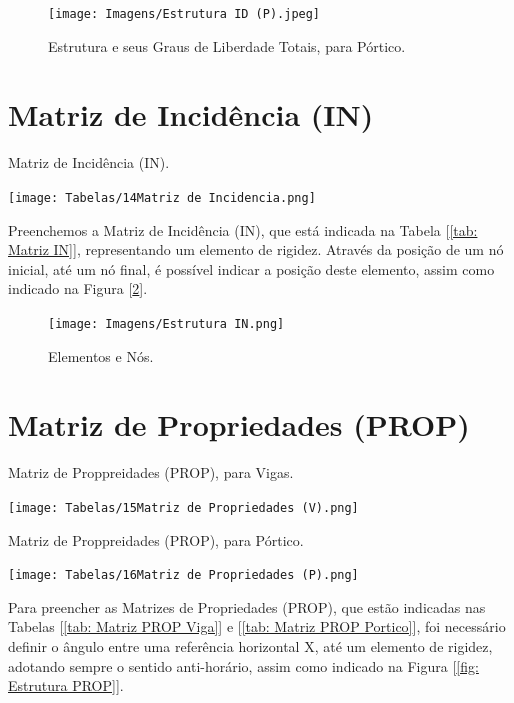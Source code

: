 \documentclass[deposito, acronym, symbols]{fei}
\begin{document}
 \begin{figure}[!htb]
 \centering
    \caption{Estrutura e seus Graus de Liberdade Totais, para Pórtico.}
    \texttt{[image: Imagens/Estrutura ID (P).jpeg]}
    \label{fig: Estrutura LM Portico}
 \end{figure}

\section{Matriz de Incidência (IN)}

\begin{table}[!htb]
 \centering
    \caption{Matriz de Incidência (IN).}
    \texttt{[image: Tabelas/14Matriz de Incidencia.png]}
    \label{tab: Matriz IN}
 \end{table}
 
Preenchemos a Matriz de Incidência (IN), que está indicada na Tabela [\ref{tab: Matriz IN}], representando um elemento de rigidez. Através da posição de um nó inicial, até um nó final, é possível indicar a posição deste elemento, assim como indicado na Figura [\ref{fig: Estrutura IN}].

\begin{figure}[!htb]
 \centering
    \caption{Elementos e Nós.}
    \texttt{[image: Imagens/Estrutura IN.png]}
    \label{fig: Estrutura IN}
 \end{figure}
 
\section{Matriz de Propriedades (PROP)}

\begin{table}[!htb]
 \centering
    \caption{Matriz de Proppreidades (PROP), para Vigas.}
    \texttt{[image: Tabelas/15Matriz de Propriedades (V).png]}
    \label{tab: Matriz PROP Viga}
 \end{table}

 \begin{table}[!htb]
 \centering
    \caption{Matriz de Proppreidades (PROP), para Pórtico.}
    \texttt{[image: Tabelas/16Matriz de Propriedades (P).png]}
    \label{tab: Matriz PROP Portico}
 \end{table}

Para preencher as Matrizes de Propriedades (PROP), que estão indicadas nas Tabelas [\ref{tab: Matriz PROP Viga}] e [\ref{tab: Matriz PROP Portico}], foi necessário definir o ângulo entre uma referência horizontal X, até um elemento de rigidez, adotando sempre o sentido anti-horário, assim como indicado na Figura [\ref{fig: Estrutura PROP}].
\end{document}
